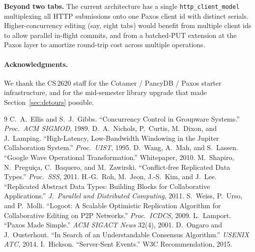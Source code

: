 \documentclass[11pt]{article}
\newcommand{\code}[1]{\texttt{#1}}
\begin{document}
\textbf{Beyond two tabs.} The current architecture has a single \code{http\_client\_model} multiplexing all HTTP submissions onto one Paxos client id with distinct serials. Higher-concurrency editing (say, eight tabs) would benefit from multiple client ids to allow parallel in-flight commits, and from a batched-PUT extension at the Paxos layer to amortize round-trip cost across multiple operations.

\paragraph{Acknowledgments.} We thank the CS\,2620 staff for the Cotamer / PancyDB / Paxos starter infrastructure, and for the mid-semester library upgrade that made Section~\ref{sec:detours} possible.

\begin{thebibliography}{9}
 C.\ A.\ Ellis and S.\ J.\ Gibbs. ``Concurrency Control in Groupware Systems.'' \emph{Proc.\ ACM SIGMOD}, 1989.
 D.\ A.\ Nichols, P.\ Curtis, M.\ Dixon, and J.\ Lamping. ``High-Latency, Low-Bandwidth Windowing in the Jupiter Collaboration System.'' \emph{Proc.\ UIST}, 1995.
 D.\ Wang, A.\ Mah, and S.\ Lassen. ``Google Wave Operational Transformation.'' Whitepaper, 2010.
 M.\ Shapiro, N.\ Pregui\c{c}a, C.\ Baquero, and M.\ Zawirski. ``Conflict-free Replicated Data Types.'' \emph{Proc.\ SSS}, 2011.
 H.-G.\ Roh, M.\ Jeon, J.-S.\ Kim, and J.\ Lee. ``Replicated Abstract Data Types: Building Blocks for Collaborative Applications.'' \emph{J.\ Parallel and Distributed Computing}, 2011.
 S.\ Weiss, P.\ Urso, and P.\ Molli. ``Logoot: A Scalable Optimistic Replication Algorithm for Collaborative Editing on P2P Networks.'' \emph{Proc.\ ICDCS}, 2009.
 L.\ Lamport. ``Paxos Made Simple.'' \emph{ACM SIGACT News} 32(4), 2001.
 D.\ Ongaro and J.\ Ousterhout. ``In Search of an Understandable Consensus Algorithm.'' \emph{USENIX ATC}, 2014.
 I.\ Hickson. ``Server-Sent Events.'' W3C Recommendation, 2015.
\end{thebibliography}
\end{document}
